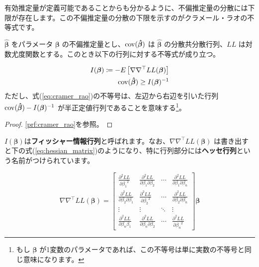 有効推定量が定義可能であることからも分かるように、不偏推定量の分散には下限が存在します。この不偏推定量の分散の下限を示すのがクラメール・ラオの不等式です。

\begin{theorem}
    \label{it:cramer_rao}
    $\bm{\hat\beta}$ をパラメータ $\bm\beta$ の不偏推定量とし、$\operatorname*{cov}(\bm{\hat\beta})$ は $\bm{\hat\beta}$ の分散共分散行列、$LL$ は対数尤度関数とする。このとき以下の行列に対する不等式が成り立つ。
    
    \begin{align}
        \label{eq:fisher_information}
        I(\bm\beta) \coloneqq -E\left[\nabla\nabla^\top LL(\bm\beta)\right] \\  
        \label{eq:cramer_rao}
        \operatorname*{cov}(\bm{\hat\beta}) \ge I(\bm\beta)^{-1}
    \end{align}
    ただし、式(\ref{eq:cramer_rao})の不等号は、左辺から右辺を引いた行列 $\operatorname*{cov}(\bm{\hat\beta})-I(\bm\beta)^{-1}$ が半正定値行列であることを意味する\footnote{もし $\bm\beta$ が1変数のパラメータであれば、この不等号は単に実数の不等号と同じ意味になります。}。
\end{theorem}
\begin{proof}
    \ref{prf:cramer_rao}を参照。
\end{proof}

$I(\bm\beta)$は\textbf{フィッシャー情報行列}と呼ばれます。なお、$\nabla\nabla^\top LL(\bm\beta)$ は書き出すと下の式(\ref{eq:hessian_matrix})のようになり、特に行列部分には\textbf{ヘッセ行列}という名前がつけられています。

\begin{equation}
    \label{eq:hessian_matrix}
    \nabla\nabla^\top LL(\bm\beta) = \begin{bmatrix}
        \frac{\partial^2 LL}{\partial {\beta_1}^2}              & \frac{\partial^2 LL}{\partial \beta_1 \partial \beta_2} & \cdots & \frac{\partial^2 LL}{\partial \beta_1 \partial \beta_n}  \\
        \frac{\partial^2 LL}{\partial \beta_2 \partial \beta_1} & \frac{\partial^2 LL}{\partial {\beta_2}^2}              & \cdots & \frac{\partial^2 LL}{\partial \beta_2 \partial \beta_n } \\
        \vdots                                                  & \vdots                                                  & \ddots & \vdots                                                   \\
        \frac{\partial^2 LL}{\partial \beta_n \beta_1}          & \frac{\partial^2 LL}{\partial \beta_n \partial \beta_2} & \cdots & \frac{\partial^2 LL}{\partial {\beta_n}^2}
    \end{bmatrix} \bm\beta
\end{equation}

